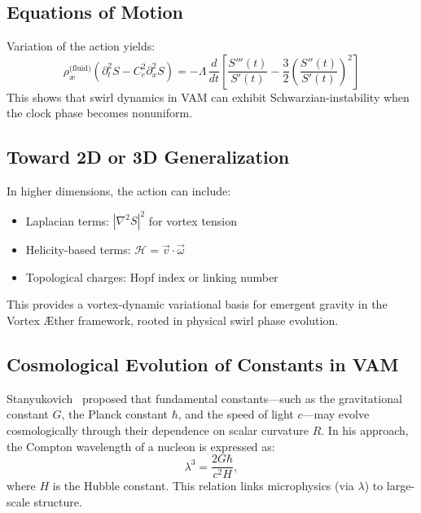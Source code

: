 \documentclass[12pt]{article}
\begin{document}
            \subsection{Equations of Motion}
            Variation of the action yields:
            \begin{equation}
            \rho_{\text{\ae}}^{\text{(fluid)}} (\partial_t^2 S - C_e^2 \partial_x^2 S) = - \Lambda \, \frac{d}{dt} \left[ \frac{S'''(t)}{S'(t)} - \frac{3}{2} \left( \frac{S''(t)}{S'(t)} \right)^2 \right]
            \end{equation}
            This shows that swirl dynamics in VAM can exhibit Schwarzian-instability when the clock phase becomes nonuniform.

            \subsection*{Toward 2D or 3D Generalization}
            In higher dimensions, the action can include:
            \begin{itemize}
            \item Laplacian terms: $|\nabla^2 S|^2$ for vortex tension
            \item Helicity-based terms: $\mathcal{H} = \vec{v} \cdot \vec{\omega}$
            \item Topological charges: Hopf index or linking number
            \end{itemize}

            This provides a vortex-dynamic variational basis for emergent gravity in the Vortex \AE ther framework, rooted in physical swirl phase evolution.

            \subsection{Cosmological Evolution of Constants in VAM}
            Stanyukovich~\cite{stanyukovich2008evolution} proposed that fundamental constants—such as the gravitational constant $G$, the Planck constant $\hbar$, and the speed of light $c$—may evolve cosmologically through their dependence on scalar curvature $R$. In his approach, the Compton wavelength of a nucleon is expressed as:
            \begin{equation}
            \lambda^3 = \frac{2G\hbar}{c^2 H},
            \end{equation}
            where $H$ is the Hubble constant. This relation links microphysics (via $\lambda$) to large-scale structure.
\end{document}
